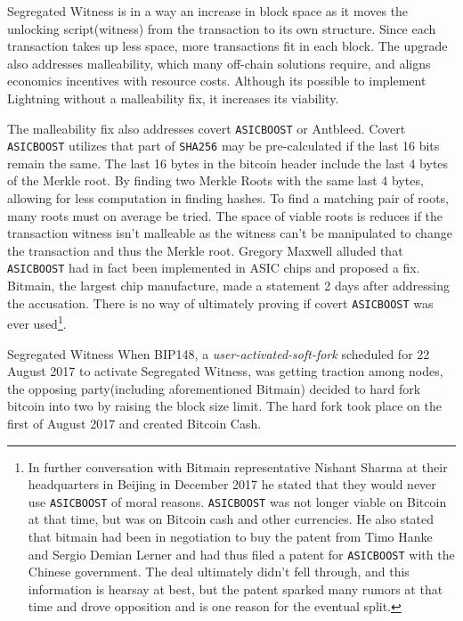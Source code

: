Segregated Witness is in a way an increase in block space as it moves the unlocking script(witness) from the transaction to its own structure. Since each transaction takes up less space, more transactions fit in each block. The upgrade also addresses malleability, which many off-chain solutions require, and aligns economics incentives with resource costs\cite{antonopoulos:segregated:witness:align:economic:incentives}. Although its possible to implement Lightning without a malleability fix, it increases its viability\cite{song:lightning:malleability}.

The malleability fix also addresses covert \texttt{ASICBOOST} or Antbleed. Covert \texttt{ASICBOOST} utilizes that part of \texttt{SHA256} may be pre-calculated if the last 16 bits remain the same. The last 16 bytes in the bitcoin header include the last 4 bytes of the Merkle root. By finding two Merkle Roots with the same last 4 bytes, allowing for less computation in finding hashes. To find a matching pair of roots, many roots must on average be tried. The space of viable roots is reduces if the transaction witness isn't malleable\cite{song:asicboost} as the witness can't be manipulated to change the transaction and thus the Merkle root. Gregory Maxwell alluded that \texttt{ASICBOOST} had in fact been implemented in ASIC chips and proposed a fix\cite{maxwell:asicboost:fix}. Bitmain, the largest chip manufacture, made a statement 2 days after addressing the accusation\cite{bitmain:response}. There is no way of ultimately proving if covert \texttt{ASICBOOST} was ever used\footnote{In further conversation with Bitmain representative Nishant Sharma at their headquarters in Beijing in December 2017 he stated that they would never use \texttt{ASICBOOST} of moral reasons. \texttt{ASICBOOST} was not longer viable on Bitcoin at that time, but was on Bitcoin cash and other currencies. He also stated that bitmain had been in negotiation to buy the patent from Timo Hanke and Sergio Demian Lerner and had thus filed a patent for \texttt{ASICBOOST} with the Chinese government. The deal ultimately didn't fell through, and this information is hearsay at best, but the patent sparked many rumors at that time and drove opposition and is one reason for the eventual split.}. 

Segregated Witness When BIP148\cite{bip:148:uasf:segwit}, a \textit{user-activated-soft-fork} scheduled for 22 August 2017 to activate Segregated Witness, was getting traction among nodes, the opposing party(including aforementioned Bitmain) decided to hard fork bitcoin into two by raising the block size limit. The hard fork took place on the first of August 2017 and created Bitcoin Cash.


